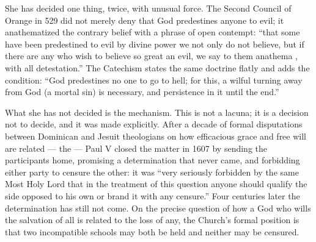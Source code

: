 She has decided one thing, twice, with unusual force. The Second Council of Orange in 529 did not merely deny that God predestines anyone to evil; it anathematized the contrary belief with a phrase of open contempt: ``that some have been predestined to evil by divine power we not only do not believe, but if there are any who wish to believe so great an evil, we say to them anathema , with all detestation.'' The Catechism states the same doctrine flatly and adds the condition: ``God predestines no one to go to hell; for this, a wilful turning away from God (a mortal sin) is necessary, and persistence in it until the end.''

What she has not decided is the mechanism. This is not a lacuna; it is a decision not to decide, and it was made explicitly. After a decade of formal disputations between Dominican and Jesuit theologians on how efficacious grace and free will are related --- the  --- Paul V closed the matter in 1607 by sending the participants home, promising a determination that never came, and forbidding either party to censure the other: it was ``very seriously forbidden by the same Most Holy Lord that in the treatment of this question anyone should qualify the side opposed to his own or brand it with any censure.'' Four centuries later the determination has still not come. On the precise question of how a God who wills the salvation of all is related to the loss of any, the Church's formal position is that two incompatible schools may both be held and neither may be censured.

